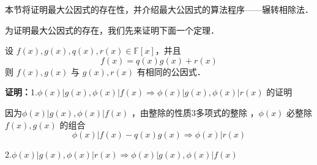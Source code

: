 
本节将证明最大公因式的存在性，并介绍最大公因式的算法程序——辗转相除法．

为证明最大公因式的存在，我们先来证明下面一个定理．
\begin{theorem}{}
设 $f(x),g(x),q(x),r(x)\in\mathbb{F}[x]$，并且
\begin{equation}
f(x)=q(x)g(x)+r(x)
\end{equation}
则 $f(x),g(x)$ 与 $g(x),r(x)$ 有相同的公因式．
\end{theorem}
\textbf{证明：}1.$\phi(x)|g(x),\phi(x)|f(x)\Rightarrow \phi(x)|g(x),\phi(x)|r(x)$ 的证明

因为$\phi(x)|g(x),\phi(x)|f(x)$ ，由整除的性质3多项式的整除 ，$\phi(x)$ 必整除 $f(x),g(x)$ 的组合
\begin{equation}
\phi(x)|f(x)-q(x)g(x)\Rightarrow \phi(x)|r(x)
\end{equation}

2.$\phi(x)|g(x),\phi(x)|r(x)\Rightarrow\phi(x)|g(x),\phi(x)|f(x)$